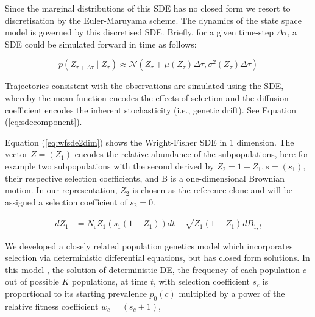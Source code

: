 \documentclass{article}
\newcommand{\eps}{N_{\text{e}}}
\begin{document}
Since the marginal distributions of this SDE has no closed form we resort to discretisation by the Euler-Maruyama \cite{malham2010introduction} scheme.
The dynamics of the state space model is governed by this discretised SDE. 
Briefly, for a given time-step $\Delta \tau$, a SDE could be simulated forward in time as follows:

\begin{equation} \label{eq:eulerssm}
p(Z_{\tau + \Delta \tau} \mid Z_{\tau}) \approx \mathcal{N} (Z_{\tau} + \mu(Z_\tau) \Delta \tau, \sigma^2 (Z_{\tau}) \Delta \tau)
\end{equation}

Trajectories consistent with the observations are simulated using the SDE, whereby the mean function encodes the effects of selection and the diffusion coefficient encodes the inherent stochasticity (i.e., genetic drift).
See Equation (\ref{eq:sdecomponent}).

Equation (\ref{eq:wfsde2dim}) shows the Wright-Fisher SDE in 1 dimension. 
The vector $Z = (Z_1)$ encodes the relative abundance of the subpopulations, here for example two subpopulations with the second derived by $Z_2 = 1 - Z_1, s = (s_1)$, their respective selection coefficients, and B is a one-dimensional Brownian motion.
In our representation, $Z_2$ is chosen as the reference clone and will be assigned a selection coefficient of $s_2 = 0$.

\begin{align}
\label{eq:wfsde2dim}
    dZ_1&=\eps Z_1(s_1(1-Z_1))dt + \sqrt{Z_1(1-Z_1)}dB_{1,t}
\end{align}    


We developed a closely related population genetics model which incorporates selection via deterministic differential equations, but has closed form solutions.
In this model \cite{sallybioguide}, the solution of deterministic DE, the frequency of each population $c$ out of possible $K$ populations, at time $t$, with selection coefficient $s_c$ is proportional to its starting prevalence $p_0(c)$ multiplied by a power of the relative fitness coefficient $w_c = (s_c + 1)$,
\end{document}
